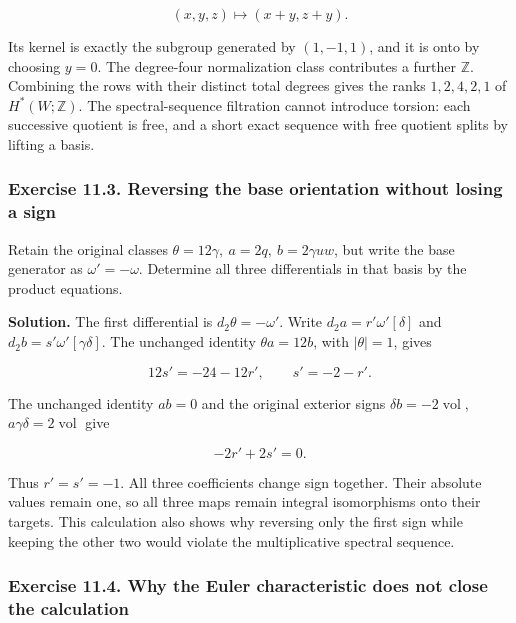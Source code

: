 \begin{equation}
(x,y,z)\longmapsto(x+y,z+y).
\label{courseIII:integral-homology-and-sphere-recognition:eq:11.6}
\end{equation}

Its kernel is exactly the subgroup generated by \((1,-1,1)\), and it is onto by choosing \(y=0\). The degree-four normalization class contributes a further \(\mathbb Z\). Combining the rows with their distinct total degrees gives the ranks \(1,2,4,2,1\) of \(H^*(W;\mathbb Z)\). The spectral-sequence filtration cannot introduce torsion: each successive quotient is free, and a short exact sequence with free quotient splits by lifting a basis.

\subsubsection{Exercise 11.3. Reversing the base orientation without losing a sign}
\label{courseIII:integral-homology-and-sphere-recognition:exercise-11.3}

Retain the original classes \(\theta=12\gamma,\ a=2q,\ b=2\gamma uw\), but write the base generator as \(\omega'=-\omega\). Determine all three differentials in that basis by the product equations.

\textbf{Solution.} The first differential is \(d_2\theta=-\omega'\). Write
\(d_2a=r'\omega'[\delta]\) and
\(d_2b=s'\omega'[\gamma\delta]\).
The unchanged identity \(\theta a=12b\), with \(|\theta|=1\), gives

\begin{equation}
12s'=-24-12r',\qquad s'=-2-r'.
\label{courseIII:integral-homology-and-sphere-recognition:eq:11.7}
\end{equation}

The unchanged identity \(ab=0\) and the original exterior signs
\(\delta b=-2\operatorname{vol}\), \(a\gamma\delta=2\operatorname{vol}\)
give

\begin{equation}
-2r'+2s'=0.
\label{courseIII:integral-homology-and-sphere-recognition:eq:11.8}
\end{equation}

Thus \(r'=s'=-1\). All three coefficients change sign together. Their absolute values remain one, so all three maps remain integral isomorphisms onto their targets. This calculation also shows why reversing only the first sign while keeping the other two would violate the multiplicative spectral sequence.

\subsubsection{Exercise 11.4. Why the Euler characteristic does not close the calculation}
\label{courseIII:integral-homology-and-sphere-recognition:exercise-11.4}

